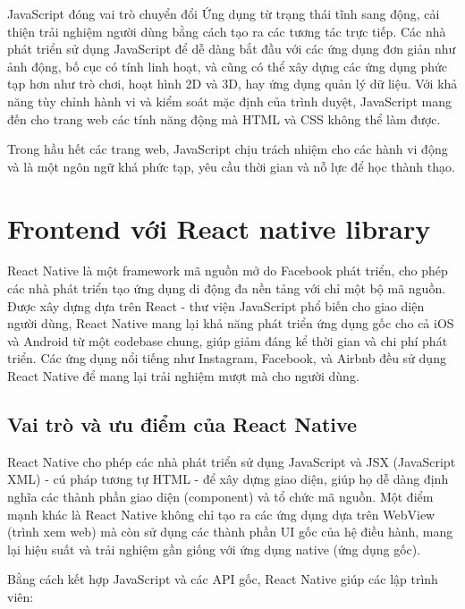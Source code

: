 \documentclass[a4paper]{report}
\begin{document}
\medskip

JavaScript đóng vai trò chuyển đổi Ứng dụng từ trạng thái tĩnh sang động, cải thiện trải nghiệm người dùng bằng cách tạo ra các tương tác trực tiếp. Các nhà phát triển sử dụng JavaScript để dễ dàng bắt đầu với các ứng dụng đơn giản như ảnh động, bố cục có tính linh hoạt, và cũng có thể xây dựng các ứng dụng phức tạp hơn như trò chơi, hoạt hình 2D và 3D, hay ứng dụng quản lý dữ liệu. Với khả năng tùy chỉnh hành vi và kiểm soát mặc định của trình duyệt, JavaScript mang đến cho trang web các tính năng động mà HTML và CSS không thể làm được.

\medskip

Trong hầu hết các trang web, JavaScript chịu trách nhiệm cho các hành vi động và là một ngôn ngữ khá phức tạp, yêu cầu thời gian và nỗ lực để học thành thạo.

\section{Frontend với React native library}

React Native là một framework mã nguồn mở do Facebook phát triển, cho phép các nhà phát triển tạo ứng dụng di động đa nền tảng với chỉ một bộ mã nguồn. Được xây dựng dựa trên React - thư viện JavaScript phổ biến cho giao diện người dùng, React Native mang lại khả năng phát triển ứng dụng gốc cho cả iOS và Android từ một codebase chung, giúp giảm đáng kể thời gian và chi phí phát triển. Các ứng dụng nổi tiếng như Instagram, Facebook, và Airbnb đều sử dụng React Native để mang lại trải nghiệm mượt mà cho người dùng.

\subsection{Vai trò và ưu điểm của React Native}

React Native cho phép các nhà phát triển sử dụng JavaScript và JSX (JavaScript XML) - cú pháp tương tự HTML - để xây dựng giao diện, giúp họ dễ dàng định nghĩa các thành phần giao diện (component) và tổ chức mã nguồn. Một điểm mạnh khác là React Native không chỉ tạo ra các ứng dụng dựa trên WebView (trình xem web) mà còn sử dụng các thành phần UI gốc của hệ điều hành, mang lại hiệu suất và trải nghiệm gần giống với ứng dụng native (ứng dụng gốc).

\medskip

Bằng cách kết hợp JavaScript và các API gốc, React Native giúp các lập trình viên:
\end{document}
